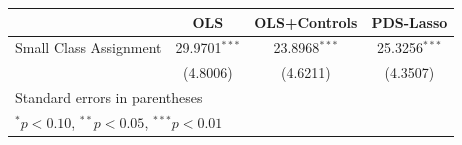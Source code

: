 {

\begin{tabular}{l*{3}{c}}
\toprule
                &\multicolumn{1}{c}{OLS}&\multicolumn{1}{c}{OLS+Controls}&\multicolumn{1}{c}{PDS-Lasso}\\
\midrule
Small Class Assignment&  29.9701$^{***}$&  23.8968$^{***}$&  25.3256$^{***}$\\
                & (4.8006)         & (4.6211)         & (4.3507)         \\
\bottomrule
\multicolumn{4}{l}{\footnotesize Standard errors in parentheses}\\
\multicolumn{4}{l}{\footnotesize $^{*}p<0.10$, $^{**}p<0.05$, $^{***}p<0.01$}\\
\end{tabular}
}
